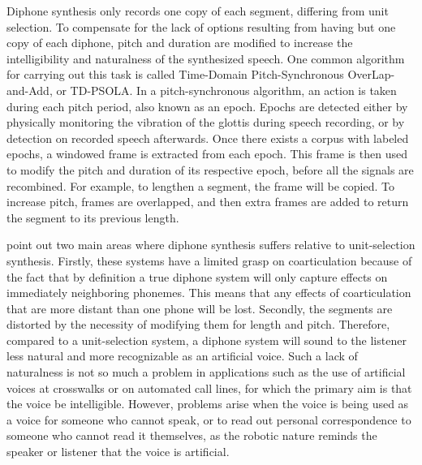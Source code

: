 \documentclass[12pt]{article}
\begin{document}
	Diphone synthesis only records one copy of each segment, differing from unit selection. To compensate for the lack of options resulting from having but one copy of each diphone, pitch and duration are modified to increase the intelligibility and naturalness of the synthesized speech. One common algorithm for carrying out this task is called Time-Domain Pitch-Synchronous OverLap-and-Add, or TD-PSOLA. In a pitch-synchronous algorithm, an action is taken during each pitch period, also known as an epoch. Epochs are detected either by physically monitoring the vibration of the glottis during speech recording, or by detection on recorded speech afterwards. Once there exists a corpus with labeled epochs, a windowed frame is extracted from each epoch. This frame is then used to modify the pitch and duration of its respective epoch, before all the signals are recombined. For example, to lengthen a segment, the frame will be copied. To increase pitch, frames are overlapped, and then extra frames are added to return the segment to its previous length. \par

	\citet{slp} point out two main areas where diphone synthesis suffers relative to unit-selection synthesis. Firstly, these systems have a limited grasp on coarticulation because of the fact that by definition a true diphone system will only capture effects on immediately neighboring phonemes. This means that any effects of coarticulation that are more distant than one phone will be lost. Secondly, the segments are distorted by the necessity of modifying them for length and pitch. Therefore, compared to a unit-selection system, a diphone system will sound to the listener less natural and more recognizable as an artificial voice. Such a lack of naturalness is not so much a problem in applications such as the use of artificial voices at crosswalks or on automated call lines, for which the primary aim is that the voice be intelligible. However, problems arise when the voice is being used as a voice for someone who cannot speak, or to read out personal correspondence to someone who cannot read it themselves, as the robotic nature reminds the speaker or listener that the voice is artificial. \par
\end{document}
